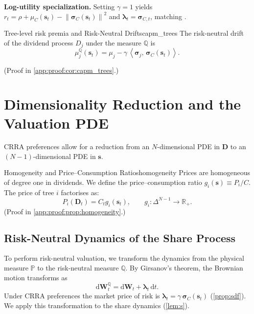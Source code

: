 \documentclass[11pt,letterpaper,oneside]{article}
\numberwithin{equation}{section}
\newcommand{\R}{\mathbb{R}}
\newcommand{\1}{\mathbf{1}}
\newcommand{\diff}{\mathrm{d}}
\newcommand{\norm}[1]{\left\lVert #1\right\rVert}
\newcommand{\ip}[2]{\left\langle #1,\,#2\right\rangle}
\begin{document}
\begin{tcolorbox}[literaturestyle]
	\textbf{Log-utility specialization.} Setting $\gamma=1$ yields $r_t=\rho+\mu_C(\bm{s}_t)-
\norm{\bm{\sigma}_C(\bm{s}_t)}^2$ and $\bm{\lambda}_t=\bm{\sigma}_{C,t}$, matching \cite{breeden1979}.

\begin{corollary}{Tree-level risk premia and Risk-Neutral Drifts}{capm_trees}
The risk-neutral drift of the dividend process $D_j$ under the measure $\mathbb{Q}$ is
\begin{equation}\label{eq:rn_drift_cor}
  \mu_j^{\mathbb{Q}}(\bm{s}_t)=\mu_j-\gamma\,\ip{\bm{\sigma}_j}{\bm{\sigma}_C(\bm{s}_t)}.
\end{equation}
\end{corollary}
(Proof in \cref{app:proof:cor:capm_trees}.)
\end{tcolorbox}

\section{Dimensionality Reduction and the Valuation PDE}\label{sec:reduction}

CRRA preferences allow for a reduction from an $N$-dimensional PDE in $\bm{D}$ to an $(N-1)$-dimensional PDE in $\bm{s}$.

\begin{proposition}{Homogeneity and Price--Consumption Ratios}{homogeneity}
Prices are homogeneous of degree one in dividends. We define the price--consumption ratio $g_i(\bm{s}) \equiv P_i/C$. The price of tree $i$ factorises as:
\begin{equation}\label{eq:pc_ratio}
  P_i(\bm{D}_t) = C_t g_i(\bm{s}_t), \qquad g_i:\Delta^{N-1}\to\R_+.
\end{equation}
(Proof in \cref{app:proof:prop:homogeneity}.)
\end{proposition}

\subsection{Risk-Neutral Dynamics of the Share Process}\label{sec:reduction:sQ}

To perform risk-neutral valuation, we transform the dynamics from the physical measure $\mathbb{P}$ to the risk-neutral measure $\mathbb{Q}$. By Girsanov's theorem, the Brownian motion transforms as
\[
  \diff\bm{W}_t^{\mathbb{Q}} = \diff\bm{W}_t + \bm{\lambda}_t\,\diff t.
\]
Under CRRA preferences the market price of risk is $\bm{\lambda}_t = \gamma\,\bm{\sigma}_C(\bm{s}_t)$ (\cref{prop:sdf}). We apply this transformation to the share dynamics (\cref{lem:s}).
\end{document}
